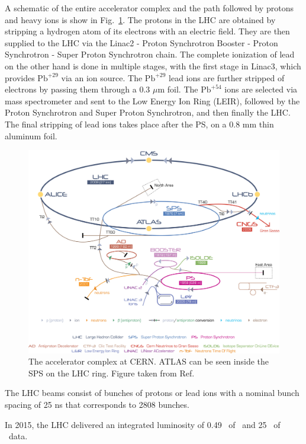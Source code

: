 A schematic of the entire accelerator complex and the path followed by protons and heavy ions is show in Fig.~\ref{fig:cern}. The protons in the LHC are obtained by stripping a hydrogen atom of its electrons with an electric field. They are then supplied to the LHC via the Linac2 - Proton Synchrotron Booster - Proton Synchrotron - Super Proton Synchrotron chain. The complete ionization of lead on the other hand is done in multiple stages, with the first stage in Linac3, which provides $\mathrm{Pb}^{+29}$ via an ion source. The $\mathrm{Pb}^{+29}$ lead ions are further stripped of electrons by passing them through a 0.3 $\mu$m foil. The $\mathrm{Pb}^{+54}$ ions are selected via mass spectrometer and sent to the Low Energy Ion Ring (LEIR), followed by the Proton Synchrotron and Super Proton Synchrotron, and then finally the LHC. The final stripping of lead ions takes place after the PS, on a 0.8 mm thin aluminum foil.

\begin{figure}[ht]
	\centering
	\includegraphics[width=1.\textwidth]{figures/setup/cern.jpg} %
	\caption{The accelerator complex at CERN. ATLAS can be seen inside the SPS on the LHC ring. Figure taken from Ref.~\cite{TEEPCLPC}}
	\label{fig:cern}%
\end{figure}

The LHC beams consist of bunches of protons or lead ions with a nominal bunch spacing of 25 ns that corresponds to 2808 bunches. 

In 2015, the LHC delivered an integrated luminosity of 0.49 \pb\ of \pbpb\ and 25 \pb\ of \pp\ data.


